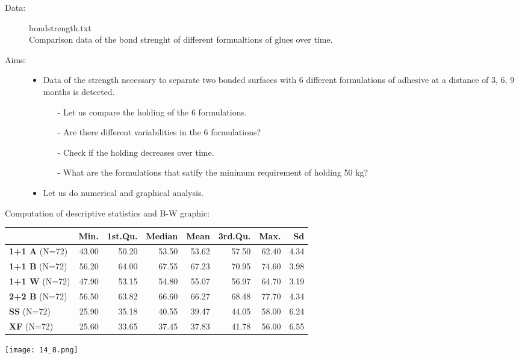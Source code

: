 \begin{frame} 
 
\begin{description}
	\item[Data:] bondstrength.txt\\
  Comparison data of the bond strenght of different formualtions of glues over time.
	\item[Aims:] \begin{itemize}
				\item Data of the strength necessary to separate two bonded surfaces with 6 different formulations of adhesive at a distance of 3, 6, 9 months is detected. 
				\begin{itemize}
					\item[-] Let us compare the holding of the 6 formulations.
					\item[-] Are there different variabilities in the 6 formulations?
					\item[-] Check if the holding decreases over time.
					\item[-] What are the formulations that satify the minimum requirement of holding 50 kg?
				\end{itemize}
				\item Let us do numerical and graphical analysis.
	                  \end{itemize}
\end{description}
 
\end{frame}

\begin{frame}
Computation of descriptive statistics and B-W graphic:\\
	\vspace{.3cm}
	\begin{footnotesize}
	\begin{tabular}{|l|rrrrrrr|}
	\hline
	& \textbf{Min}. & 1\textbf{st.Qu}. & \textbf{Median} & \textbf{Mean} & \textbf{3rd.Qu.} & \textbf{Max.} & \textbf{Sd}\\
	\hline
	\textbf{1+1 A} (N=72)& 43.00& 50.20& 53.50& 53.62& 57.50& 62.40& 4.34\\
	\textbf{1+1 B} (N=72)& 56.20& 64.00& 67.55& 67.23& 70.95& 74.60& 3.98\\
	\textbf{1+1 W} (N=72)& 47.90& 53.15& 54.80& 55.07& 56.97& 64.70& 3.19\\
	\textbf{2+2 B} (N=72)& 56.50& 63.82& 66.60& 66.27& 68.48& 77.70& 4.34\\
	\textbf{SS}    (N=72)& 25.90& 35.18& 40.55& 39.47& 44.05& 58.00& 6.24\\
	\textbf{XF}    (N=72)& 25.60& 33.65& 37.45& 37.83& 41.78& 56.00& 6.55\\
	\hline	
	\end{tabular}
	\end{footnotesize}
	\begin{center}
		\texttt{[image: 14\_8.png]}
	\end{center}
\end{frame}

